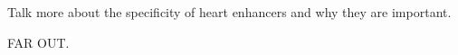         
        Talk more about the specificity of heart enhancers and why they are important.


        FAR OUT. 
        


        
        
        
        

        


	
